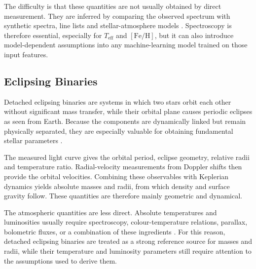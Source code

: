The difficulty is that these quantities are not usually obtained by direct measurement. They are inferred by comparing the observed spectrum with synthetic spectra, line lists and stellar-atmosphere models \citep{tsantaki2018}. Spectroscopy is therefore essential, especially for $T_{\mathrm{eff}}$ and $[\mathrm{Fe}/\mathrm{H}]$, but it can also introduce model-dependent assumptions into any machine-learning model trained on those input features.



\subsection{Eclipsing Binaries}
Detached eclipsing binaries are systems in which two stars orbit each other without significant mass transfer, while their orbital plane causes periodic eclipses as seen from Earth. Because the components are dynamically linked but remain physically separated, they are especially valuable for obtaining fundamental stellar parameters \citep{Southworth2015,Eker2018}.

The measured light curve gives the orbital period, eclipse geometry, relative radii and temperature ratio. Radial-velocity measurements from Doppler shifts then provide the orbital velocities. Combining these observables with Keplerian dynamics yields absolute masses and radii, from which density and surface gravity follow. These quantities are therefore mainly geometric and dynamical.

The atmospheric quantities are less direct. Absolute temperatures and luminosities usually require spectroscopy, colour-temperature relations, parallax, bolometric fluxes, or a combination of these ingredients \citep{Graczyk2022}. For this reason, detached eclipsing binaries are treated as a strong reference source for masses and radii, while their temperature and luminosity parameters still require attention to the assumptions used to derive them.


